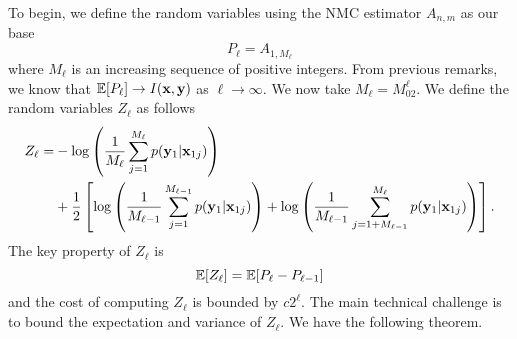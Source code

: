 \documentclass[a4paper, 10pt]{report}
\theoremstyle{plain}
\begin{document}
	To begin, we define the random variables using the NMC estimator $A_{n,m}$ as our base
	\begin{equation}
	P_\ell = A_{1,M_\ell}
	\end{equation}
	where $M_\ell$ is an increasing sequence of positive integers. From previous remarks, we know that $\mathbb{E} [P_\ell] \to I({\mathbf{x}},{\mathbf{y}})$ as $\ell\to\infty$. We now take $M_\ell=M_02^\ell$.
	We define the random variables $Z_\ell$ as follows
	\begin{equation}
	\begin{split}
	Z_\ell =& -\log \left(\frac{1}{M_{\ell}} \sum_{j=1}^{M_{\ell}} p({\mathbf{y}}_1|{\mathbf{x}}_{1j})\right) \\&+ \frac{1}{2}\left[\log \left(\frac{1}{M_{\ell-1}} \sum_{j=1}^{M_{\ell-1}} p({\mathbf{y}}_1|{\mathbf{x}}_{1j})\right) + \log \left(\frac{1}{M_{\ell-1}} \sum_{j=1+M_{\ell-1}}^{M_{\ell}} p({\mathbf{y}}_1|{\mathbf{x}}_{1j})\right) \right].
	\end{split}
	\end{equation}
	The key property of $Z_\ell$ is
	\begin{equation}
	\mathbb{E}[Z_\ell] = \mathbb{E}[P_\ell - P_{\ell-1}]
	\end{equation}
	and the cost of computing $Z_\ell$ is bounded by $c2^\ell$. The main technical challenge is to bound the expectation and variance of $Z_\ell$.
	We have the following theorem.
\end{document}
